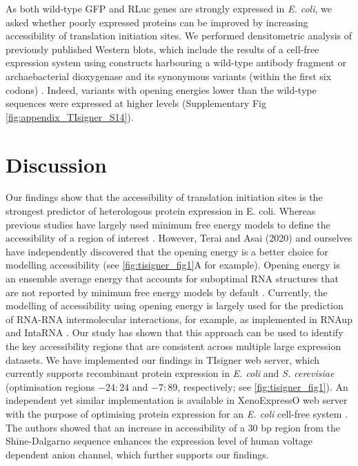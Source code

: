 As both wild-type GFP and RLuc genes are strongly expressed in \textit{E. coli}, we asked whether poorly expressed proteins can be improved by increasing accessibility of translation initiation sites. We performed densitometric analysis of previously published Western blots, which include the results of a cell-free expression system using constructs harbouring a wild-type antibody fragment or archaebacterial dioxygenase and its synonymous variants (within the first six codons) \cite{Voges2004-dt}. Indeed, variants with opening energies lower than the wild-type sequences were expressed at higher levels (Supplementary Fig \ref{fig:appendix_TIsigner_S14}).

\section{Discussion}
Our findings show that the accessibility of translation initiation sites is the strongest predictor of heterologous protein expression in E. coli. Whereas previous studies have largely used minimum free energy models to define the accessibility of a region of interest \cite{Salis2009-dh,Bhattacharyya2018-zy,Nieuwkoop2019-ft,Voges2004-dt,pelletier1987involvement}. However, Terai and Asai (2020) and ourselves have independently discovered that the opening energy is a better choice for modelling accessibility \cite{Bhandari2021-wd,Terai2020-co} (see \ref{fig:tisigner_fig1}A for example). Opening energy is an ensemble average energy that accounts for suboptimal RNA structures that are not reported by minimum free energy models by default \cite{Muckstein2006-ys,Bernhart2011-cc}. Currently, the modelling of accessibility using opening energy is largely used for the prediction of RNA-RNA intermolecular interactions, for example, as implemented in RNAup and IntaRNA \cite{Lorenz2011-rg,Mann2017-yy}. Our study has shown that this approach can be used to identify the key accessibility regions that are consistent across multiple large expression datasets. We have implemented our findings in TIsigner web server, which currently supports recombinant protein expression in \textit{E. coli} and \textit{S. cerevisiae} (optimisation regions $−24:24$ and $−7:89$, respectively; see \ref{fig:tisigner_fig1}). An independent yet similar implementation is available in XenoExpressO web server with the purpose of optimising protein expression for an \textit{E. coli} cell-free system \cite{Zayni2018-wc}. The authors showed that an increase in accessibility of a 30 bp region from the Shine-Dalgarno sequence enhances the expression level of human voltage dependent anion channel, which further supports our findings.

